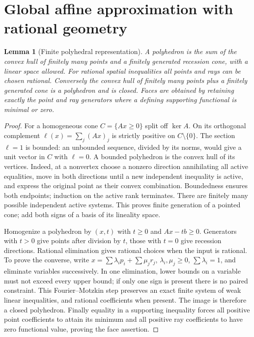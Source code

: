 \documentclass[11pt]{article}
\newtheorem{lemma}[theorem]{Lemma}
\theoremstyle{definition}\newtheorem{definition}[theorem]{Definition}
\theoremstyle{remark}\newtheorem{remark}[theorem]{Remark}
\begin{document}
\section{Global affine approximation with rational geometry}
\begin{lemma}[Finite polyhedral representation]\label{lem:polyhedron}
A polyhedron is the sum of the convex hull of finitely many points and a finitely generated recession cone, with a linear space allowed. For rational spatial inequalities all points and rays can be chosen rational. Conversely the convex hull of finitely many points plus a finitely generated cone is a polyhedron and is closed. Faces are obtained by retaining exactly the point and ray generators where a defining supporting functional is minimal or zero.
\end{lemma}
\begin{proof}
For a homogeneous cone $C=\{Ax\geq0\}$ split off $\ker A$. On its orthogonal complement $\ell(x)=\sum_j(Ax)_j$ is strictly positive on $C\setminus\{0\}$. The section $\ell=1$ is bounded: an unbounded sequence, divided by its norms, would give a unit vector in $C$ with $\ell=0$. A bounded polyhedron is the convex hull of its vertices. Indeed, at a nonvertex choose a nonzero direction annihilating all active equalities, move in both directions until a new independent inequality is active, and express the original point as their convex combination. Boundedness ensures both endpoints; induction on the active rank terminates. There are finitely many possible independent active systems. This proves finite generation of a pointed cone; add both signs of a basis of its lineality space.

Homogenize a polyhedron by $(x,t)$ with $t\geq0$ and $Ax-tb\geq0$. Generators with $t>0$ give points after division by $t$, those with $t=0$ give recession directions. Rational elimination gives rational choices when the input is rational. To prove the converse, write $x=\sum\lambda_i p_i+\sum\mu_j r_j$, $\lambda_i,\mu_j\geq0$, $\sum\lambda_i=1$, and eliminate variables successively. In one elimination, lower bounds on a variable must not exceed every upper bound; if only one sign is present there is no paired constraint. This Fourier--Motzkin step preserves an exact finite system of weak linear inequalities, and rational coefficients when present. The image is therefore a closed polyhedron. Finally equality in a supporting inequality forces all positive point coefficients to attain its minimum and all positive ray coefficients to have zero functional value, proving the face assertion.
\end{proof}
\end{document}
